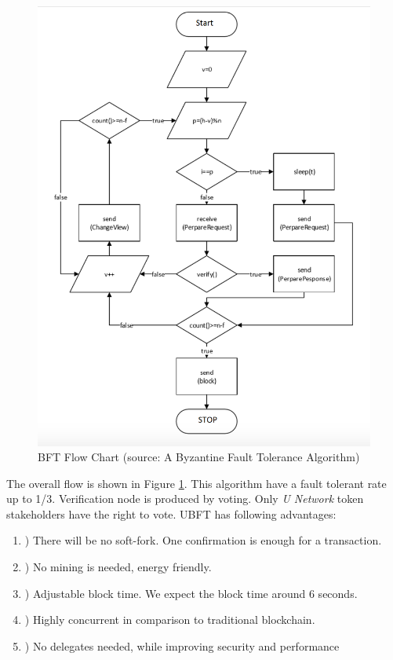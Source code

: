 \begin{figure}
\centering
\includegraphics[width= 0.7 \linewidth]{consensus.png}
\caption{BFT Flow Chart (source: A Byzantine Fault Tolerance Algorithm\cite{neo})}
\label{fig:ubft}
\end{figure}    
    
    The overall flow is shown in Figure \ref{fig:ubft}. This algorithm have a fault tolerant rate up to 1/3. Verification node is produced by voting. Only \emph{U Network} token stakeholders have the right to vote.  UBFT has following advantages:
\begin{enumerate}
    \item ) There will be no soft-fork. One confirmation is enough for a transaction. 
    \item ) No mining is needed, energy friendly.
    \item ) Adjustable block time. We expect the block time around 6 seconds. 
    \item ) Highly concurrent in comparison to traditional blockchain. 
    \item ) No delegates needed, while improving security and performance
\end{enumerate}



